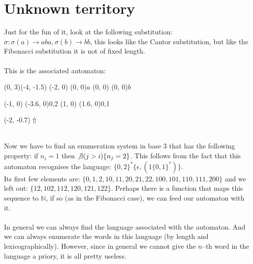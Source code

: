 \documentclass{article}
\begin{document}
\section*{Unknown territory}
Just for the fun of it, look at the following substitution:
$\sigma : \sigma(a) \rightarrow aba, \sigma(b) \rightarrow bb$, this looks
like the Cantor substitution, but like the Fibonacci substitution it is not of
fixed length.\\
\\
This is the associated automaton:\\
\begin{graph}(0, 3)(-4, -1.5)
  (-2, 0) (0, 0){$a$}
  (0, 0)  (0, 0){$b$}

  (-1, 0) \freetext(-3.6, 0){0,2}
   
  (1, 0) \freetext(1.6, 0){0,1}

  \freetext(-2, -0.7){$\Uparrow$}
\end{graph}\\
Now we have to find an enumeration system in base 3 that has the following
property: if $n_i = 1$ then $\not\exists (j > i) \{ n_j = 2\}$. This follows
from the fact that this automaton recognises the language:
$\{0, 2\}^* \{\epsilon, (1\{0, 1\}^*)\}$.\\
Its first few elements are:
$\{0, 1, 2, 10, 11, 20, 21, 22, 100, 101, 110, 111, 200\}$ and we left out:
$\{12, 102, 112, 120, 121, 122\}$. Perhaps there is a function that maps
this sequence to $\mathbb{N}$, if so (as in the Fibonacci case), we can feed
our automaton with it.\\
\\
In general we can always find the language associated with the automaton. And
we can always enumerate the words in this language (by length and
lexicographically). However, since in general we cannot give the $n$--th word
in the language a priory, it is all pretty useless.
\end{document}
